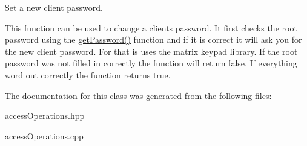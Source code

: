 Set a new client password. 

This function can be used to change a clients password. It first checks the root password using the \hyperlink{classaccess_operations_a23a9545b9b8636b995aa6e3d007ea524}{get\+Password()} function and if it is correct it will ask you for the new client password. For that is uses the matrix keypad library. If the root password was not filled in correctly the function will return false. If everything word out correctly the function returns true. 

The documentation for this class was generated from the following files\+:\begin{DoxyCompactItemize}
\item 
access\+Operations.\+hpp\item 
access\+Operations.\+cpp\end{DoxyCompactItemize}
